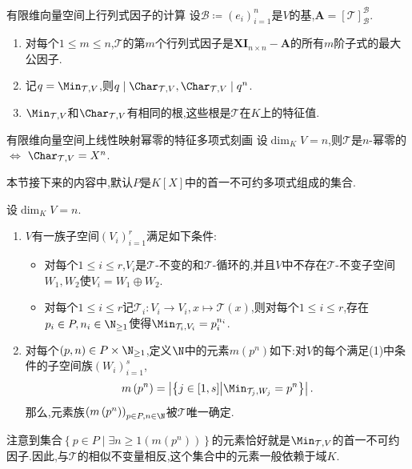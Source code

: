 \begin{corollary}{有限维向量空间上行列式因子的计算}{}
	设$\mathcal{B}\coloneq\left(e_{i}\right)_{i=1}^{n}$是$V$的基,$\boldsymbol{A}=\left[\mathcal{T}\right]_{\mathcal{B}}^{\mathcal{B}}$.
	\begin{enumerate}
		\item 对每个$1\leq m\leq n$,$\mathcal{T}$的第$m$个行列式因子是$\boldsymbol{X}\boldsymbol{I}_{n\times n}-\boldsymbol{A}$的所有$m$阶子式的最大公因子.
		\item 记$q=\Min_{\mathcal{T},V}$,则$q\mid\Char_{\mathcal{T},V},\Char_{\mathcal{T},V}\mid q^{n}$.
		\item $\Min_{\mathcal{T},V}$和$\Char_{\mathcal{T},V}$有相同的根,这些根是$\mathcal{T}$在$K$上的特征值.
	\end{enumerate}
\end{corollary}

\begin{corollary}{有限维向量空间上线性映射幂零的特征多项式刻画}{}
	设$\dim_{K}V=n$,则$\mathcal{T}$是$n$-幂零的$\iff$ $\Char_{\mathcal{T},V}=X^{n}$.
\end{corollary}

本节接下来的内容中,默认$P$是$K[X]$中的首一不可约多项式组成的集合.

\begin{proposition}{}{}
	设$\dim_{K}V=n$.
	\begin{enumerate}
		\item $V$有一族子空间$\left(V_{i}\right)_{i=1}^{r}$满足如下条件:
		\begin{itemize}
			\item 对每个$1\leq i\leq r$,$V_{i}$是$\mathcal{T}$-不变的和$\mathcal{T}$-循环的,并且$V$中不存在$\mathcal{T}$-不变子空间$W_{1},W_{2}$使$V_{i}=W_{1}\oplus W_{2}$.
			\item 对每个$1\leq i\leq r$记$\mathcal{T}_{i}:V_{i}\to V_{i},x\mapsto\mathcal{T}\left(x\right)$,则对每个$1\leq i\leq r$,存在$p_{i}\in P,n_{i}\in\N_{\geq 1}$使得$\Min_{\mathcal{T}_{i},V_{i}}=p_{i}^{n_{i}}$.
		\end{itemize}
		\item 对每个$\left(p,n\right)\in P\times\N_{\geq 1}$,定义$\N$中的元素$m\left(p^{n}\right)$如下:对$V$的每个满足(1)中条件的子空间族$\left(W_{i}\right)_{i=1}^{s}$,
		\begin{align*}
			m\left(p^{n}\right)=\left|\left\{j\in\left[1,s\right]\middle|\Min_{\mathcal{T}_{j},W_{j}}=p^{n}\right\}\right|.
		\end{align*}
		那么,元素族$\left(m\left(p^{n}\right)\right)_{p\in P,n\in\N}$被$\mathcal{T}$唯一确定.
	\end{enumerate}
\end{proposition}

\begin{remark}{}{}
	注意到集合$\left\{p\in P\middle|\exists n\geq 1\left(m\left(p^{n}\right)\right)\right\}$的元素恰好就是$\Min_{\mathcal{T},V}$的首一不可约因子.因此,与$\mathcal{T}$的相似不变量相反,这个集合中的元素一般依赖于域$K$.
\end{remark}



